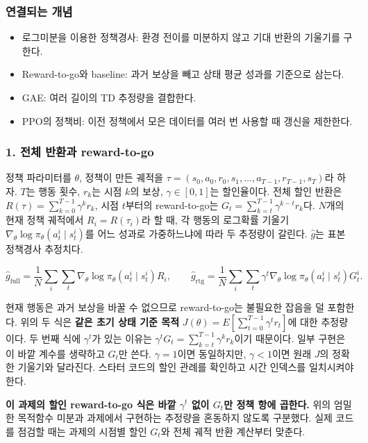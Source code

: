 \documentclass[11pt,a4paper]{article}
\begin{document}
\subsubsection{연결되는 개념}

\begin{itemize}
\item 로그미분을 이용한 정책경사: 환경 전이를 미분하지 않고 기대 반환의 기울기를 구한다.
\item Reward-to-go와 baseline: 과거 보상을 빼고 상태 평균 성과를 기준으로 삼는다.
\item GAE: 여러 길이의 TD 추정량을 결합한다.
\item PPO의 정책비: 이전 정책에서 모은 데이터를 여러 번 사용할 때 갱신을 제한한다.
\end{itemize}

\subsubsection{1. 전체 반환과 reward-to-go}

정책 파라미터를 $\theta$, 정책이 만든 궤적을 $\tau=(s_0,a_0,r_0,s_1,\ldots,a_{T-1},r_{T-1},s_T)$라 하자. $T$는 행동 횟수, $r_k$는 시점 $k$의 보상, $\gamma\in[0,1]$는 할인율이다. 전체 할인 반환은 $R(\tau)=\sum_{k=0}^{T-1}\gamma^k r_k$, 시점 $t$부터의 reward-to-go는 $G_t=\sum_{k=t}^{T-1}\gamma^{k-t}r_k$다. $N$개의 현재 정책 궤적에서 $R_i=R(\tau_i)$라 할 때, 각 행동의 로그확률 기울기 $\nabla_\theta\log\pi_\theta(a_t^i\mid s_t^i)$를 어느 성과로 가중하느냐에 따라 두 추정량이 갈린다. $\widehat g$는 표본 정책경사 추정치다.\par

\[
\widehat g_{\mathrm{full}}
=\frac1N\sum_i\sum_t\nabla_\theta\log\pi_\theta(a_t^i\mid s_t^i)R_i,
\qquad
\widehat g_{\mathrm{rtg}}
=\frac1N\sum_i\sum_t\gamma^t
\nabla_\theta\log\pi_\theta(a_t^i\mid s_t^i)G_t^i.
\]

현재 행동은 과거 보상을 바꿀 수 없으므로 reward-to-go는 불필요한 잡음을 덜 포함한다. 위의 두 식은 \textbf{같은 초기 상태 기준 목적} $J(\theta)=E[\sum_{t=0}^{T-1}\gamma^t r_t]$에 대한 추정량이다. 두 번째 식에 $\gamma^t$가 있는 이유는 $\gamma^tG_t=\sum_{k=t}^{T-1}\gamma^k r_k$이기 때문이다. 일부 구현은 이 바깥 계수를 생략하고 $G_t$만 쓴다. $\gamma=1$이면 동일하지만, $\gamma<1$이면 원래 $J$의 정확한 기울기와 달라진다. 스타터 코드의 할인 관례를 확인하고 시간 인덱스를 일치시켜야 한다.\par

\textbf{이 과제의 할인 reward-to-go 식은 바깥 $\gamma^t$ 없이 $G_t$만 정책 항에 곱한다.} 위의 엄밀한 목적함수 미분과 과제에서 구현하는 추정량을 혼동하지 않도록 구분했다. 실제 코드를 점검할 때는 과제의 시점별 할인 $G_t$와 전체 궤적 반환 계산부터 맞춘다.\par
\end{document}
